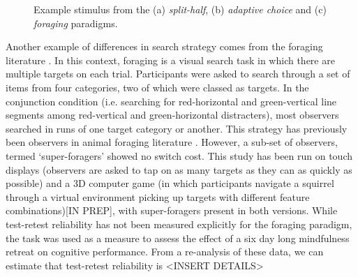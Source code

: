 \documentclass[]{rsos}%
\begin{document}
\begin{figure}
\centering
{}
\caption{Example stimulus from the (a) \textit{split-half}, (b) \textit{adaptive choice} and (c) \textit{foraging} paradigms.}
\label{fig:exampleStimuli}
\end{figure}

Another example of differences in search strategy comes from the foraging literature \cite{kristjansson2014,johannesson2016}. In this context, foraging is a visual search task in which there are multiple targets on each trial. Participants were asked to search through a set of items from four categories, two of which were classed as targets. In the conjunction condition (i.e. searching for red-horizontal and green-vertical line segments among red-vertical and green-horizontal distracters), most observers searched in runs of one target category or another. This strategy has previously been observers in animal foraging literature \cite{dawkins1971}. However, a sub-set of observers, termed `super-foragers' showed no switch cost. This study has been run on touch displays\cite{kristjansson2014} (observers are asked to tap on as many targets as they can as quickly as possible) and a 3D computer game (in which participants navigate a squirrel through a virtual environment picking up targets with different feature combinations)[IN PREP], with super-foragers present in both versions. While test-retest reliability has not been measured explicitly for the foraging paradigm, the task was used as a measure to assess the effect of a six day long mindfulness retreat on cognitive performance\cite{hartkamp2017}. From a re-analysis of these data, we can estimate that test-retest reliability is <INSERT DETAILS> 
\end{document}
